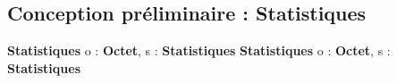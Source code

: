\subsection{Conception préliminaire : Statistiques}

\begin{algorithme}
    {}{\textbf{Statistiques}}
    {}
    {o : \textbf{Octet}, s : \textbf{Statistiques}}
    {\textbf{Statistiques}}
    {}
    {o : \textbf{Octet}, s : \textbf{Statistiques}}
    {\naturel}
    {}
\end{algorithme}